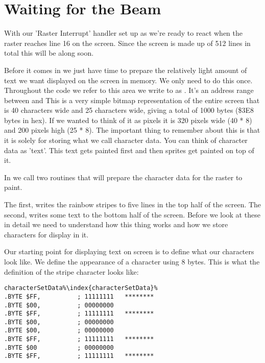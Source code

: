 \section{Waiting for the Beam}
With our 'Raster Interrupt' handler set up as  we're ready to 
react when the raster reaches line 16 on the screen. Since the screen is made up of 512 lines in
total this will be along soon.

Before it comes in we just have time to prepare the relatively light amount of text we want displayed
on the screen in memory. We only need to do this once. Throughout the code we refer to this
area we write to as . It's an address range between  and  This is a very
simple bitmap representation of the entire screen that is 40 characters wide and 25 characters wide,
giving a total of 1000 bytes (\$3E8 bytes in hex). If we wanted to think of it as pixels it is 320 pixels wide (40 * 8)
and 200 pixels high (25 * 8). The important thing to remember about this  is that it is solely
for storing what we call character data. You can think of character data as 'text'. This text gets painted
first and then sprites get painted on top of it.

In  we call two routines that will prepare the character data for the raster to paint. 

The first,  writes the rainbow stripes to five lines in the top half of the screen. 
The second,  writes some text to the bottom half of the screen. Before we look at these
in detail we need to understand how this thing  works and how we store characters for display in it.

Our starting point for displaying text on screen is to define what our characters look like. We define the appearance
of a character using 8 bytes. This is what the definition of the stripe character looks like: 

\clearpage
\begin{lstlisting}[caption= The 'stripe' character\index{character}.,escapechar=\%]
characterSetData%\index{characterSetData}%
.BYTE $FF,          ; 11111111   ********
.BYTE $00,          ; 00000000           
.BYTE $FF,          ; 11111111   ********
.BYTE $00,          ; 00000000           
.BYTE $00,          ; 00000000           
.BYTE $FF,          ; 11111111   ********
.BYTE $00           ; 00000000           
.BYTE $FF,          ; 11111111   ********
\end{lstlisting}

